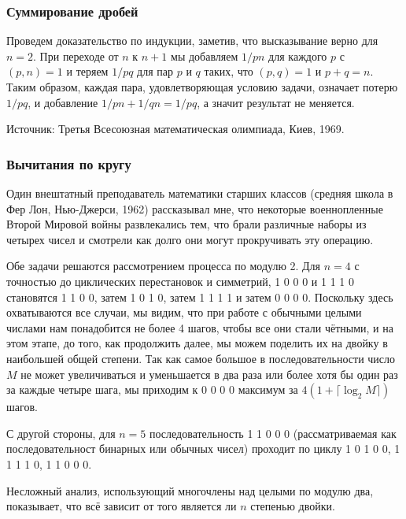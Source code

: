 \subsubsection*{Суммирование дробей}%


Проведем доказательство по индукции, заметив, что высказывание верно для $n=2$.
При переходе от $n$  к $n+1$  мы добавляем $1/pn$  для каждого $p$ с $(p,n)=1$ и теряем $1/pq$ для пар $p$ и $q$ таких, что $(p,q)=1$ и $p+q=n$.
Таким образом, каждая пара,  удовлетворяющая условию задачи,  означает потерю $1/pq$, и добавление $1/pn+1/qn=1/pq$, а значит результат не меняется.\heart

Источник:  Третья  Всесоюзная математическая олимпиада, Киев, 1969.


\subsubsection*{Вычитания по кругу}%


Один внештатный преподаватель математики  старших классов (средняя школа в Фер Лон, Нью-Джерси, 1962)
рассказывал мне,
что некоторые военнопленные Второй Мировой войны развлекались тем, что брали различные наборы из четырех чисел и смотрели как долго они могут прокручивать эту операцию. 

\medskip

Обе задачи решаются рассмотрением процесса по модулю 2.
Для  $n=4$  с точностью до циклических перестановок и симметрий, 1 0 0 0 и
1 1 1 0  становятся  1 1 0 0, затем 1 0 1 0, затем 1 1 1 1  и затем   0 0 0 0.
Поскольку здесь охватываются все случаи, мы видим, что при работе с обычными целыми числами нам понадобится не более 4 шагов, чтобы все они стали чётными, и на этом этапе, до того, как продолжить далее, мы можем поделить их на двойку в наибольшей общей степени. 
Так как самое большое в последовательности число $M$ не может увеличиваться и уменьшается в два раза или более хотя бы один раз за каждые четыре шага, 
мы приходим к 0 0 0 0 максимум за $4(1+\lceil\log_2 M\rceil)$ шагов.

С другой стороны, для   $n=5$   последовательность  1 1 0 0 0 (рассматриваемая как последовательност бинарных или обычных чисел)
проходит по циклу  
1 0 1 0 0,  
1 1 1 1 0,  
1 1 0 0 0.\heart


Несложный анализ, использующий многочлены над целыми по модулю два, показывает, что всё зависит от того является ли $n$ степенью двойки.


